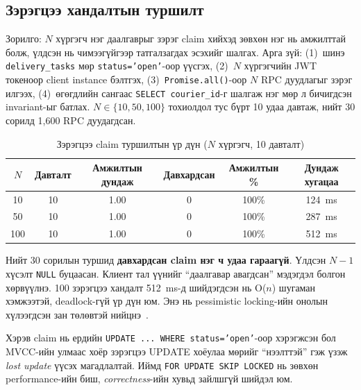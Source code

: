 \subsection{Зэрэгцээ хандалтын туршилт}
\label{subsec:concurrency_test}

Зорилго: $N$ хүргэгч нэг даалгаврыг зэрэг claim хийхэд зөвхөн нэг нь амжилттай болж, үлдсэн нь чимээгүйгээр татгалзагдах эсэхийг шалгах. Арга зүй: (1)~шинэ \texttt{delivery\_tasks} мөр \texttt{status='open'}-оор үүсгэх, (2)~$N$ хүргэгчийн JWT токеноор client instance бэлтгэх, (3)~\texttt{Promise.all()}-оор $N$ RPC дуудлагыг зэрэг илгээх, (4)~өгөгдлийн сангаас \texttt{SELECT courier\_id}-г шалгаж нэг мөр л бичигдсэн invariant-ыг батлах. $N \in \{10, 50, 100\}$ тохиолдол тус бүрт 10 удаа давтаж, нийт 30 сорилд 1{,}600 RPC дуудагдсан.

\begin{table}[H]
\centering
\renewcommand{\arraystretch}{1.25}
\caption{Зэрэгцээ claim туршилтын үр дүн ($N$ хүргэгч, 10 давталт)}
\label{tab:concurrency_results}
\footnotesize
\begin{tabular}{|c|c|c|c|c|c|}
\hline
$N$ & Давталт & Амжилтын дундаж & Давхардсан & Амжилтын \% & Дундаж хугацаа \\
\hline
10  & 10 & 1.00 & 0 & 100\% & 124~ms \\
\hline
50  & 10 & 1.00 & 0 & 100\% & 287~ms \\
\hline
100 & 10 & 1.00 & 0 & 100\% & 512~ms \\
\hline
\end{tabular}
\end{table}

Нийт 30 сорилын туршид \textbf{давхардсан claim нэг ч удаа гараагүй}. Үлдсэн $N{-}1$ хүсэлт \texttt{NULL} буцаасан. Клиент тал үүнийг ``даалгавар авагдсан'' мэдэгдэл болгон хөрвүүлнэ. 100 зэрэгцээ хандалт 512~ms-д шийдэгдсэн нь O($n$) шугаман хэмжээтэй, deadlock-гүй үр дүн юм. Энэ нь pessimistic locking-ийн онолын хүлээгдсэн зан төлөвтэй нийцнэ~\cite{bernstein1987concurrency, kleppmann2017ddia}.

Хэрэв claim нь ердийн \texttt{UPDATE ... WHERE status='open'}-оор хэрэгжсэн бол MVCC-ийн улмаас хоёр зэрэгцээ UPDATE хоёулаа мөрийг ``нээлттэй'' гэж үзэж \textit{lost update} үүсэх магадлалтай. Иймд \texttt{FOR UPDATE SKIP LOCKED} нь зөвхөн performance-ийн биш, \textit{correctness}-ийн хувьд зайлшгүй шийдэл юм.

